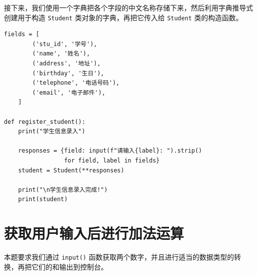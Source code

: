 \documentclass[openany, 10pt]{ctexart}
\begin{document}
接下来，我们使用一个字典把各个字段的中文名称存储下来，然后利用字典推导式创建用于构造 \lstinline|Student| 类对象的字典，再把它传入给 \lstinline|Student| 类的构造函数。
\begin{lstlisting}
fields = [
        ('stu_id', '学号'),
        ('name', '姓名'),
        ('address', '地址'),
        ('birthday', '生日'),
        ('telephone', '电话号码'),
        ('email', '电子邮件'),
    ]

def register_student():
    print("学生信息录入")

    responses = {field: input(f"请输入{label}: ").strip()
                 for field, label in fields}
    student = Student(**responses)

    print("\n学生信息录入完成!")
    print(student)
\end{lstlisting}
    
\section{获取用户输入后进行加法运算}
    
本题要求我们通过 \lstinline|input()| 函数获取两个数字，并且进行适当的数据类型的转换，再把它们的和输出到控制台。

\end{document}
